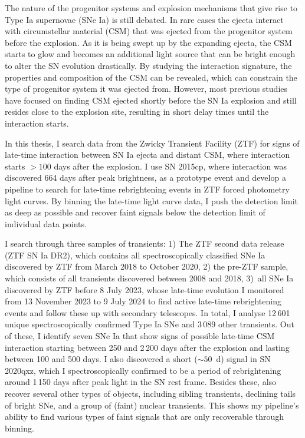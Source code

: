 

\begin{abstracts} 
The nature of the progenitor systems and explosion mechanisms that give rise to Type Ia supernovae (SNe Ia) is still debated. In rare cases the ejecta interact with circumstellar material (CSM) that was ejected from the progenitor system before the explosion. As it is being swept up by the expanding ejecta, the CSM starts to glow and becomes an additional light source that can be bright enough to alter the SN evolution drastically. By studying the interaction signature, the properties and composition of the CSM can be revealed, which can constrain the type of progenitor system it was ejected from. However, most previous studies have focused on finding CSM ejected shortly before the SN Ia explosion and still resides close to the explosion site, resulting in short delay times until the interaction starts.

In this thesis, I search data from the Zwicky Transient Facility (ZTF) for signs of late-time interaction between SN Ia ejecta and distant CSM, where interaction starts $>100$ days after the explosion. I use SN 2015cp, where interaction was discovered 664 days after peak brightness, as a prototype event and develop a pipeline to search for late-time rebrightening events in ZTF forced photometry light curves. By binning the late-time light curve data, I push the detection limit as deep as possible and recover faint signals below the detection limit of individual data points.

I search through three samples of transients: 1) The ZTF second data release (ZTF SN Ia DR2), which contains all spectroscopically classified SNe Ia discovered by ZTF from March 2018 to October 2020, 2) the pre-ZTF sample, which consists of all transients discovered between 2008 and 2018, 3)~all SNe Ia discovered by ZTF before 8 July 2023, whose late-time evolution I monitored from 13 November 2023 to 9 July 2024 to find active late-time rebrightening events and follow these up with secondary telescopes. In total, I analyse 12\,601 unique spectroscopically confirmed Type Ia SNe and 3\,089 other transients. Out of these, I identify seven SNe Ia that show signs of possible late-time CSM interaction starting between 250 and 2\,200 days after the explosion and lasting between 100 and 500 days. I also discovered a short ($\sim50$~d) signal in SN 2020qxz, which I spectroscopically confirmed to be a period of rebrightening around 1\,150 days after peak light in the SN rest frame. Besides these, also recover several other types of objects, including sibling transients, declining tails of bright SNe, and a group of (faint) nuclear transients. This shows my pipeline's ability to find various types of faint signals that are only recoverable through binning.


\end{abstracts}
